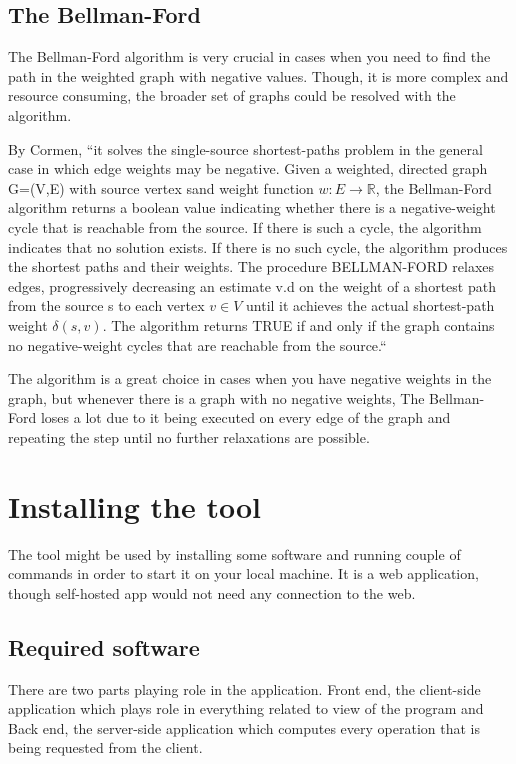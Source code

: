 \subsection{The Bellman-Ford}

The Bellman-Ford algorithm is very crucial in cases when you need to find the path in the weighted graph with negative values. Though, it is more complex and resource consuming, the broader set of graphs could be resolved with the algorithm. 

By Cormen, ``it solves the single-source shortest-paths problem in the general case in which edge weights may be negative. Given a weighted, directed graph G=(V,E) with source vertex sand weight function $w : E \rightarrow \mathbb{R}$, the Bellman-Ford algorithm returns a boolean value indicating whether there is a negative-weight cycle that is reachable from the source. If there is such a cycle, the algorithm indicates that no solution exists. If there is no such cycle, the algorithm produces the shortest paths and their weights. The procedure BELLMAN-FORD relaxes edges, progressively decreasing an estimate v.d on the weight of a shortest path from the source s to each vertex $v \in V$ until it achieves the actual shortest-path weight $\delta(s,v)$. The algorithm returns TRUE if and only if the graph contains no negative-weight cycles that are reachable from the source.``~\cite{cormen-introduction-to-algorithms}

The algorithm is a great choice in cases when you have negative weights in the graph, but whenever there is a graph with no negative weights, The Bellman-Ford loses a lot due to it being executed on every edge of the graph and repeating the step until no further relaxations are possible.

\section{Installing the tool}

The tool might be used by installing some software and running couple of commands in order to start it on your local machine. It is a web application, though self-hosted app would not need any connection to the web.

\subsection{Required software}

There are two parts playing role in the application. Front end, the client-side application which plays role in everything related to view of the program and Back end, the server-side application which computes every operation that is being requested from the client.

